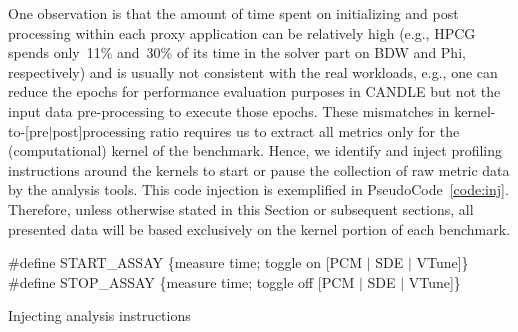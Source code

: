One observation is that the amount of time spent on initializing and post processing within
each proxy application can be relatively high (e.g., HPCG spends only~11\% and~30\% of its
time in the solver part on BDW and Phi, respectively) and is usually not consistent with the real workloads, e.g., one can
reduce the epochs for performance evaluation purposes in CANDLE but not the input data
pre-processing to execute those epochs. These mismatches in kernel-to-[pre$|$post]processing ratio
requires us to extract all metrics only for the (computational) kernel of the benchmark.
Hence, we identify and inject profiling instructions around the kernels to start or pause the
collection of raw metric data by the analysis tools. This code injection is exemplified in
PseudoCode~\ref{code:inj}. Therefore, unless otherwise stated in this Section or subsequent sections,
all presented data will be based exclusively on the kernel portion of each benchmark.
%
\begin{algorithm}[tbp]
    \label{code:inj}
    \#define START\_ASSAY \{measure time; toggle on [PCM $|$ SDE $|$ VTune]\} \;
    \#define STOP\_ASSAY \{measure time; toggle off [PCM $|$ SDE $|$ VTune]\} \;
    \caption{Injecting analysis instructions}
\end{algorithm}


